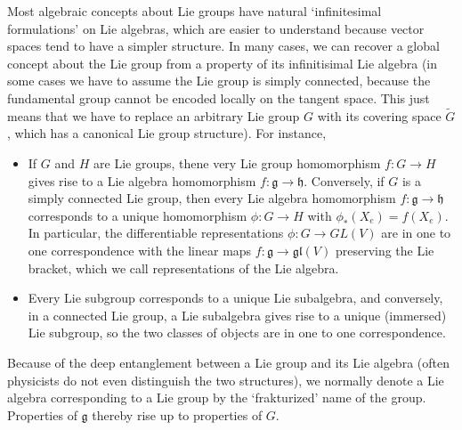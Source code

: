 Most algebraic concepts about Lie groups have natural `infinitesimal formulations' on Lie algebras, which are easier to understand because vector spaces tend to have a simpler structure. In many cases, we can recover a global concept about the Lie group from a property of its infinitisimal Lie algebra (in some cases we have to assume the Lie group is simply connected, because the fundamental group cannot be encoded locally on the tangent space. This just means that we have to replace an arbitrary Lie group $G$ with its covering space $\tilde{G}$, which has a canonical Lie group structure). For instance,
%
\begin{itemize}
    \item If $G$ and $H$ are Lie groups, thene very Lie group homomorphism $f: G \to H$ gives rise to a Lie algebra homomorphism $f: \mathfrak{g} \to \mathfrak{h}$. Conversely, if $G$ is a simply connected Lie group, then every Lie algebra homomorphism $f: \mathfrak{g} \to \mathfrak{h}$ corresponds to a unique homomorphism $\phi: G \to H$ with $\phi_*(X_e) = f(X_e)$. In particular, the differentiable representations $\phi: G \to GL(V)$ are in one to one correspondence with the linear maps $f: \mathfrak{g} \to \mathfrak{gl}(V)$ preserving the Lie bracket, which we call representations of the Lie algebra.

    \item Every Lie subgroup corresponds to a unique Lie subalgebra, and conversely, in a connected Lie group, a Lie subalgebra gives rise to a unique (immersed) Lie subgroup, so the two classes of objects are in one to one correspondence.
\end{itemize}
%
Because of the deep entanglement between a Lie group and its Lie algebra (often physicists do not even distinguish the two structures), we normally denote a Lie algebra corresponding to a Lie group by the `frakturized' name of the group. Properties of $\mathfrak{g}$ thereby rise up to properties of $G$.

